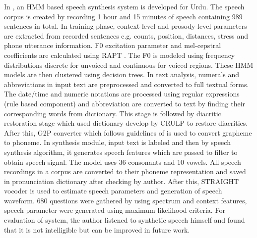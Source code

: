 In \cite{ahmed2014hmm}, an HMM based speech synthesis system is developed for Urdu. The speech corpus is created by recording 1 hour and 15 minutes of speech containing 989 sentences in total. In training phase, context level and prosody level parameters are extracted from recorded sentences e.g. counts, position, distances, stress and phone utterance information. F0 excitation parameter and mel-cepstral coefficients are calculated using RAPT \cite{kleijn1995speech}. The F0 is modeled using frequency distributions discrete for unvoiced and continuous for voiced regions. These HMM models are then clustered using decision trees. In text analysis, numerals and abbreviations in input text are preprocessed and converted to full textual forms. The date/time and numeric notations are processed using regular expressions (rule based component) and abbreviation are converted to text by finding their corresponding words from dictionary. This stage is followed by diacritic restoration stage which used dictionary develop by CRULP \cite{crulp} to restore diacritics. After this, G2P converter which follows guidelines of \cite{hussain2004sound} is used to convert grapheme to phoneme. In synthesis module, input text is labeled and then by speech synthesis algorithm, it generates speech features which are passed to filter to obtain speech signal. The model uses 36 consonants and 10 vowels. All speech recordings in a corpus are converted to their phoneme representation and saved in pronunciation dictionary after checking by author. After this, STRAIGHT vocoder is used to estimate speech parameters and generation of speech waveform. 680 questions were gathered by using spectrum and context features, speech parameter were generated using maximum likelihood criteria. For evaluation of system, the author listened to synthetic speech himself and found that it is not intelligible but can be improved in future work.

